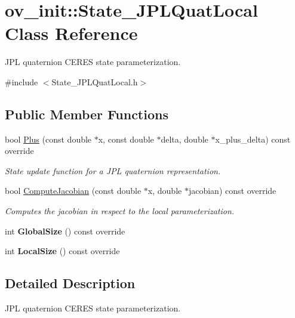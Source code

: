 \hypertarget{classov__init_1_1State__JPLQuatLocal}{}\section{ov\+\_\+init\+:\+:State\+\_\+\+J\+P\+L\+Quat\+Local Class Reference}
\label{classov__init_1_1State__JPLQuatLocal}


J\+PL quaternion C\+E\+R\+ES state parameterization.  




{\ttfamily \#include $<$State\+\_\+\+J\+P\+L\+Quat\+Local.\+h$>$}

\subsection*{Public Member Functions}
\begin{DoxyCompactItemize}
\item 
bool \hyperlink{classov__init_1_1State__JPLQuatLocal_ae0d6f02fa9043878a623bc46aee0c928}{Plus} (const double $\ast$x, const double $\ast$delta, double $\ast$x\+\_\+plus\+\_\+delta) const override
\begin{DoxyCompactList}\small\item\em State update function for a J\+PL quaternion representation. \end{DoxyCompactList}\item 
bool \hyperlink{classov__init_1_1State__JPLQuatLocal_ab6732d5027ddfa89a76d00ef35ee2fc8}{Compute\+Jacobian} (const double $\ast$x, double $\ast$jacobian) const override
\begin{DoxyCompactList}\small\item\em Computes the jacobian in respect to the local parameterization. \end{DoxyCompactList}\item 
\mbox{\label{classov__init_1_1State__JPLQuatLocal_af801ab9594a21ccd98c5525ff121a399}} 
int {\bfseries Global\+Size} () const override
\item 
\mbox{\label{classov__init_1_1State__JPLQuatLocal_a2f8902e5be623d71aa7299b666afe4c8}} 
int {\bfseries Local\+Size} () const override
\end{DoxyCompactItemize}


\subsection{Detailed Description}
J\+PL quaternion C\+E\+R\+ES state parameterization. 

